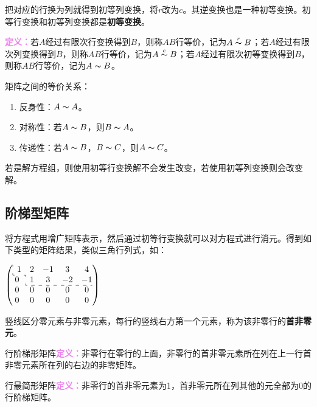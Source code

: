 \documentclass[UTF8, 12pt]{ctexart}
\begin{document}
把对应的行换为列就得到初等列变换，将$r$改为$c$。其逆变换也是一种初等变换。初等行变换和初等列变换都是\textbf{初等变换}。

\textcolor{violet}{\textbf{定义：}}若$A$经过有限次行变换得到$B$，则称$AB$行等价，记为$A\overset{r}{\thicksim}B$；若$A$经过有限次列变换得到$B$，则称$AB$行等价，记为$A\overset{c}{\thicksim}B$；若$A$经过有限次初等变换得到$B$，则称$AB$行等价，记为$A\thicksim B$。

矩阵之间的等价关系：

\begin{enumerate}
    \item 反身性：$A\thicksim A$。
    \item 对称性：若$A\thicksim B$，则$B\thicksim A$。
    \item 传递性：若$A\thicksim B$，$B\thicksim C$，则$A\thicksim C$。
\end{enumerate}

若是解方程组，则使用初等行变换解不会发生改变，若使用初等列变换则会改变解。

\subsection{阶梯型矩阵}

将方程式用增广矩阵表示，然后通过初等行变换就可以对方程式进行消元。得到如下类型的矩阵结果，类似三角行列式，如：

\begin{multicols}{2}
    
    $
    \left(
    \begin{array}{@{} c c c c c @{}}
        \multicolumn{1}{: c}{1} & 2 & -1 &  3 &  4 \\
      \cdashline{1-1}
      0 & \multicolumn{1}{: c}{1} &  3 & -2 & -1 \\
      \cdashline{2-5}
      0 & 0 &  0 &  0 &  0 \\
      0 & 0 &  0 &  0 &  0
    \end{array}
    \right)
    $

    竖线区分零元素与非零元素，每行的竖线右方第一个元素，称为该非零行的\textbf{首非零元}。

\end{multicols}

行阶梯形矩阵\textcolor{violet}{\textbf{定义：}}非零行在零行的上面，非零行的首非零元素所在列在上一行首非零元素所在列的右边的非零矩阵。

行最简形矩阵\textcolor{violet}{\textbf{定义：}}非零行的首非零元素为1，首非零元所在列其他的元全部为0的行阶梯矩阵。
\end{document}
